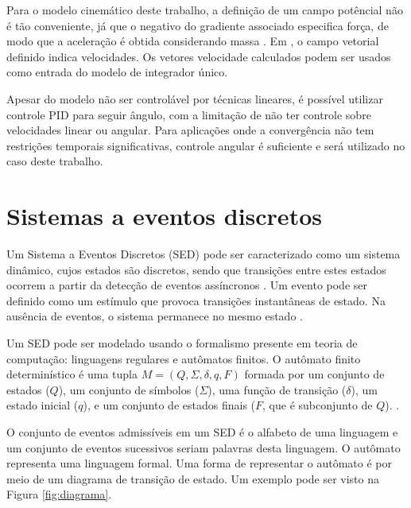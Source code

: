 Para o modelo cinemático deste trabalho, a definição de um campo potêncial não é
tão conveniente, já que o negativo do gradiente associado especifica
força, de modo que a aceleração é obtida considerando massa
\cite{art:wallfollowing, book:HallidayDaMassa}. Em ,
o campo vetorial definido indica velocidades. Os vetores velocidade calculados
podem ser usados como entrada do modelo de integrador único.

Apesar do modelo não ser controlável por técnicas lineares, é possível utilizar 
controle PID para seguir ângulo, com a limitação de não ter controle sobre 
velocidades linear ou angular. Para aplicações onde a convergência não tem
restrições temporais significativas, controle angular é suficiente e será 
utilizado no caso deste trabalho.


\section{Sistemas a eventos discretos}

Um Sistema a Eventos Discretos (SED) pode ser caracterizado como um sistema
dinâmico, cujos estados são discretos, sendo que transições entre estes estados ocorrem
a partir da detecção de eventos assíncronos \cite{book:SED}. Um evento pode ser
definido como um estímulo que provoca transições instantâneas de estado. Na
ausência de eventos, o sistema permanece no mesmo estado \cite{man:Cury}.

Um SED pode ser modelado usando o formalismo presente em teoria de computação:
linguagens regulares e autômatos finitos. O autômato finito determinístico é uma
tupla $M=(Q,\Sigma,\delta,q,F)$ formada por um conjunto de estados ($Q$), um conjunto
de símbolos ($\Sigma$), uma função de transição ($\delta$), um estado inicial
($q$), e um conjunto de estados finais ($F$, que é subconjunto de $Q$). \cite{book:SED,
book:TeoriaComp}.

O conjunto de eventos admissíveis em um SED é o alfabeto de uma linguagem e um
conjunto de eventos sucessivos seriam palavras desta linguagem. O autômato
representa uma linguagem formal. Uma forma de representar o autômato é por meio
de um diagrama de transição de estado. Um exemplo pode ser visto na Figura
\ref{fig:diagrama}.



